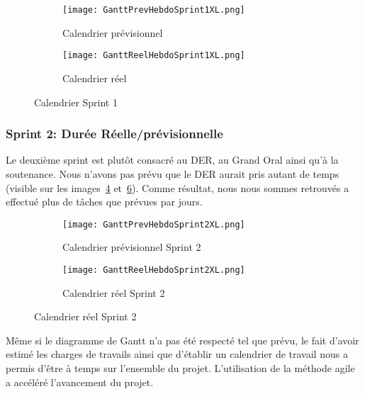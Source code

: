 \begin{figure}
   \centering
   \begin{subfigure}{.5\textwidth}
     \centering
     \texttt{[image: GanttPrevHebdoSprint1XL.png]}
   	\caption[]{Calendrier prévisionnel}
   	\label{fig:gantPrevHebdo1}
   \end{subfigure}%
   \begin{subfigure}{.5\textwidth}
     \centering
     \texttt{[image: GanttReelHebdoSprint1XL.png]}
   	\caption[]{Calendrier réel}
   	\label{fig:GantReelHebdo1}
   \end{subfigure}
   \caption{Calendrier Sprint 1}
\end{figure}


\subsubsection{Sprint 2: Durée Réelle/prévisionnelle}
Le deuxième sprint est plutôt consacré au DER, au Grand Oral ainsi qu'à la soutenance.
Nous n'avons pas prévu que le DER aurait pris autant de temps (visible sur les images~\ref{fig:gantPrevHebdo2} et~\ref{fig:GantReelHebdo2}).
Comme résultat, nous nous sommes retrouvés a effectué plus de tâches que prévues par jours. 

\begin{figure}
  \centering
  \begin{subfigure}{.5\textwidth}
    \centering
    \texttt{[image: GanttPrevHebdoSprint2XL.png]}
  	\caption[]{Calendrier prévisionnel Sprint 2}
  	\label{fig:gantPrevHebdo2}
  \end{subfigure}%
  \begin{subfigure}{.5\textwidth}
    \centering
    \texttt{[image: GanttReelHebdoSprint2XL.png]}
  	\caption[]{Calendrier réel Sprint 2}
  	\label{fig:GantReelHebdo2}
  \end{subfigure}
\end{figure}

Même si le diagramme de Gantt n'a pas été respecté tel que prévu, le fait d’avoir estimé les charges de travails ainsi que d'établir un calendrier de travail nous a permis d'être à temps sur l'ensemble du projet.
L'utilisation de la méthode agile a accéléré l'avancement du projet.


